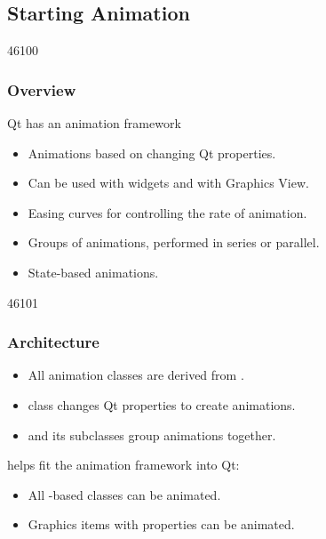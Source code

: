 %
%
%
%

\subsection{Starting Animation}

\begin{slide}{46100}\frametitle{Overview}
\label{animations}
\vspace*{1.5em}
Qt has an animation framework
\begin{itemize}
\item Animations based on changing Qt properties.
\item Can be used with widgets and with Graphics View.
\item Easing curves for controlling the rate of animation.
\item Groups of animations, performed in series or parallel.
\item State-based animations.
\end{itemize}
\end{slide}


\begin{slide}{46101}\frametitle{Architecture}
\vspace*{1.5em}
\begin{itemize}
\item All animation classes are derived from .
\item {} class changes Qt properties to create animations.
\item {} and its subclasses group animations together.
\end{itemize}

 helps fit the animation framework into Qt:
\begin{itemize}
\item All -based classes can be animated.
\item Graphics items with properties can be animated.
\end{itemize}

\end{slide}

